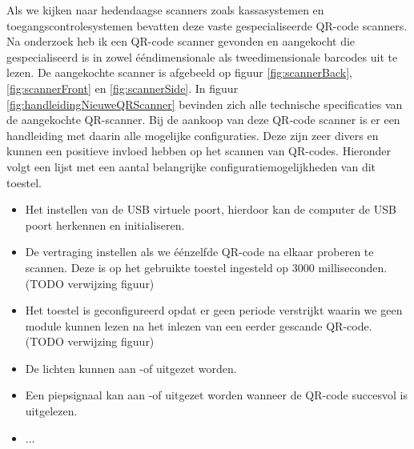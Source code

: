 Als we kijken naar hedendaagse scanners zoals kassasystemen en toegangscontrolesystemen bevatten deze vaste gespecialiseerde QR-code scanners. Na onderzoek heb ik een QR-code scanner gevonden en aangekocht die gespecialiseerd is in zowel ééndimensionale als tweedimensionale barcodes uit te lezen. De aangekochte scanner is afgebeeld op figuur \ref{fig:scannerBack}, \ref{fig:scannerFront} en \ref{fig:scannerSide}. In figuur \ref{fig:handleidingNieuweQRScanner} bevinden zich alle technische specificaties van de aangekochte QR-scanner. Bij de aankoop van deze QR-code scanner is er een handleiding met daarin alle mogelijke configuraties. Deze zijn zeer divers en kunnen een positieve invloed hebben op het scannen van QR-codes. Hieronder volgt een lijst met een aantal belangrijke configuratiemogelijkheden van dit toestel.

\begin{itemize}
    \item Het instellen van de USB virtuele poort, hierdoor kan de computer de USB poort herkennen en initialiseren. 
    \item De vertraging instellen als we éénzelfde QR-code na elkaar proberen te scannen. Deze is op het gebruikte toestel ingesteld op 3000 milliseconden. (TODO verwijzing figuur)
    \item Het toestel is geconfigureerd opdat er geen periode verstrijkt waarin we geen module kunnen lezen na het inlezen van een eerder gescande QR-code. (TODO verwijzing figuur)
    \item De lichten kunnen aan -of uitgezet worden.
    \item Een piepsignaal kan aan -of uitgezet worden wanneer de QR-code succesvol is uitgelezen.
    \item ...
\end{itemize}



